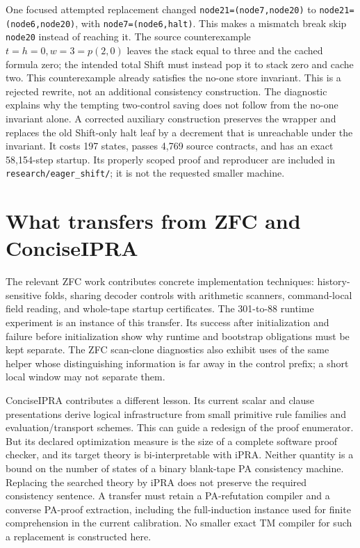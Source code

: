 \documentclass[11pt,letterpaper]{article}
\newcommand{\file}[1]{\texttt{\nolinkurl{#1}}}
\begin{document}
One focused attempted replacement changed
\file{node21=(node7,node20)} to \file{node21=(node6,node20)}, with
\file{node7=(node6,halt)}. This makes a mismatch break skip
\file{node20} instead of reaching it. The source counterexample
$t=h=0,w=3=p(2,0)$ leaves the stack equal to three and the cached formula zero;
the intended total Shift must instead pop it to stack zero and cache two.
This counterexample already satisfies the no-one store invariant.
This is a rejected rewrite, not an additional consistency construction.
The diagnostic explains why the tempting two-control saving does not
follow from the no-one invariant alone. A corrected auxiliary construction
preserves the wrapper and replaces the old Shift-only halt leaf by a
decrement that is unreachable under the invariant. It costs 197 states,
passes 4,769 source contracts, and has an exact 58,154-step startup. Its
properly scoped proof and reproducer are included in
\file{research/eager_shift/}; it is not the requested smaller machine.



\section{What transfers from ZFC and ConciseIPRA}

The relevant ZFC work contributes concrete implementation techniques:
history-sensitive folds, sharing decoder controls with arithmetic scanners,
command-local field reading, and whole-tape startup certificates. The
301-to-88 runtime experiment is an instance of this transfer. Its success
after initialization and failure before initialization show why runtime and
bootstrap obligations must be kept separate. The ZFC scan-clone diagnostics
also exhibit uses of the same helper whose distinguishing information is
far away in the control prefix; a short local window may not separate them.

ConciseIPRA contributes a different lesson. Its current scalar and clause
presentations derive logical infrastructure from small primitive rule
families and evaluation/transport schemes. This can guide a redesign of
the proof enumerator. But its declared optimization measure is the size of
a complete software proof checker, and its target theory is bi-interpretable
with iPRA. Neither quantity is a bound on the number of states of a binary
blank-tape PA consistency machine. Replacing the searched theory by iPRA
does not preserve the required consistency sentence. A transfer must retain
a PA-refutation compiler and a converse PA-proof extraction, including the
full-induction instance used for finite comprehension in the current
calibration. No smaller exact TM compiler for such a replacement is
constructed here.\cite{ipra}
\end{document}
